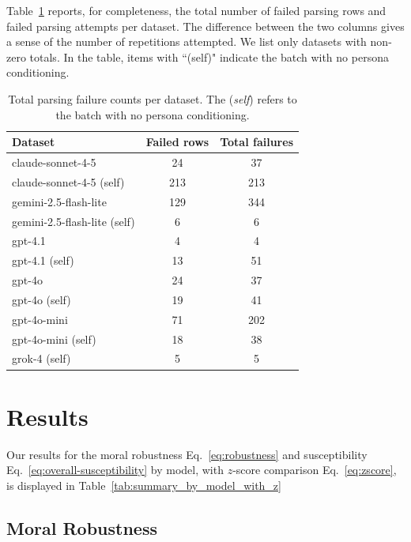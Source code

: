 \documentclass{article}
\begin{document}
Table~\ref{tab:failures_by_model} reports, for completeness, the total number of failed parsing rows and failed parsing attempts per dataset. The difference between the two columns gives a sense of the number of repetitions attempted. We list only datasets with non-zero totals. In the table, items with ``(self)" indicate the batch with no persona conditioning.

\begin{table}[t]
  \centering
  \caption{Total parsing failure counts per dataset. The (\textit{self}) refers to the batch with no persona conditioning.}
  \label{tab:failures_by_model}
  \begin{tabular}{lcc}
    \toprule
    Dataset & Failed rows & Total failures \\
    \midrule
    claude-sonnet-4-5 & 24 & 37  \\
    claude-sonnet-4-5 (self) & 213	& 213  \\
    gemini-2.5-flash-lite & 129 & 344 \\
    gemini-2.5-flash-lite (self) & 6 & 6 \\
    gpt-4.1 & 4 & 4   \\
    gpt-4.1 (self) & 13 & 51   \\
    gpt-4o & 24 & 37  \\
    gpt-4o (self) & 19 & 41  \\
    gpt-4o-mini & 71 & 202 \\
    gpt-4o-mini (self) & 18 & 38 \\
    grok-4 (self) & 5 & 5 \\
    \bottomrule
  \end{tabular}
\end{table}




\section{Results}

Our results for the moral robustness Eq.~\eqref{eq:robustness} and susceptibility Eq.~\eqref{eq:overall-susceptibility} by model, with $z$-score comparison Eq.~\eqref{eq:zscore}, is displayed in Table~\ref{tab:summary_by_model_with_z}



\subsection{Moral Robustness}
\end{document}
